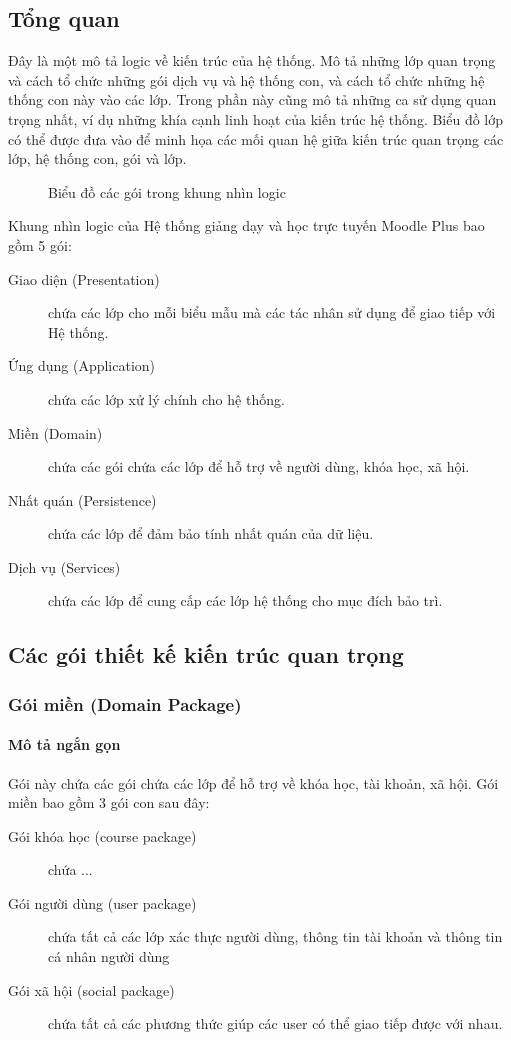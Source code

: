 \documentclass[./../main_file.tex]{subfiles}
\begin{document}
	\subsection{Tổng quan}
	Đây là một mô tả logic về kiến trúc của hệ thống. Mô tả những lớp quan trọng và cách tổ chức những gói dịch vụ và hệ thống con, và cách tổ chức những hệ thống con này vào các lớp. Trong phần này cũng mô tả những ca sử dụng quan trọng nhất, ví dụ những khía cạnh linh hoạt của kiến trúc hệ thống. Biểu đồ lớp có thể được đưa vào để minh họa các mối quan hệ giữa kiến trúc quan trọng các lớp, hệ thống con, gói và lớp.
	\begin{figure}[H]
		\centering
		\resizebox{0.8\textwidth}{!}{}
		\caption{Biểu đồ các gói trong khung nhìn logic}
	\end{figure}
	Khung nhìn logic của Hệ thống giảng dạy và học trực tuyến Moodle Plus bao gồm 5 gói:
	\begin{description}
		\item[Giao diện (Presentation)] chứa các lớp cho mỗi biểu mẫu mà các tác nhân sử dụng để giao tiếp với Hệ thống.
		\item[Ứng dụng (Application)] chứa các lớp xử lý chính cho hệ thống.
		\item[Miền (Domain)] chứa các gói chứa các lớp để hỗ trợ về người dùng, khóa học, xã hội.
		\item[Nhất quán (Persistence)] chứa các lớp để đảm bảo tính nhất quán của dữ liệu.
		\item[Dịch vụ (Services)] chứa các lớp để cung cấp các lớp hệ thống cho mục đích bảo trì.
	\end{description}

	\subsection{Các gói thiết kế kiến trúc quan trọng}
	\subsubsection{Gói miền (Domain Package)}
	\paragraph{Mô tả ngắn gọn}
	Gói này chứa các gói chứa các lớp để hỗ trợ về khóa học, tài khoản, xã hội. Gói miền bao gồm 3 gói con sau đây:
	\begin{description}
		\item[Gói khóa học (course package)] chứa ...
		\item[Gói người dùng (user package)] chứa tất cả các lớp xác thực người dùng, thông tin tài khoản và thông tin cá nhân người dùng
		\item[Gói xã hội (social package)] chứa tất cả các phương thức giúp các user có thể giao tiếp được với nhau.
	\end{description}
\end{document}
